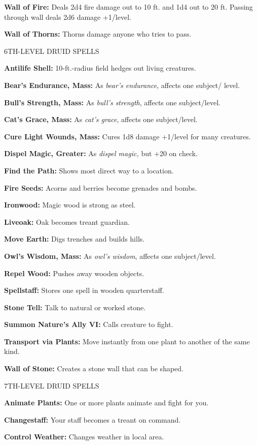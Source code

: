 \documentclass{article}
\begin{document}
\textbf{Wall of Fire:} Deals 2d4 fire damage out to 10 ft. and 1d4 out to 20 ft. 
Passing through wall deals 2d6 damage +1/level.

\textbf{Wall of Thorns:} Thorns damage anyone who tries to pass.

6TH-LEVEL DRUID SPELLS

\textbf{Antilife Shell:} 10-ft.-radius field hedges out living creatures.

\textbf{Bear's Endurance, Mass:} As \textit{bear's endurance}, affects one subject/ 
level.

\textbf{Bull's Strength, Mass:} As \textit{bull's strength}, affects one subject/level.

\textbf{Cat's Grace, Mass:} As \textit{cat's grace}, affects one subject/level.

\textbf{Cure Light Wounds, Mass:} Cures 1d8 damage +1/level for many creatures.

\textbf{Dispel Magic, Greater:} As \textit{dispel magic, }but +20 on check.

\textbf{Find the Path:} Shows most direct way to a location.

\textbf{Fire Seeds:} Acorns and berries become grenades and bombs.

\textbf{Ironwood:} Magic wood is strong as steel.

\textbf{Liveoak:} Oak becomes treant guardian.

\textbf{Move Earth:} Digs trenches and builds hills.

\textbf{Owl's Wisdom, Mass:} As \textit{owl's wisdom}, affects one subject/level.

\textbf{Repel Wood:} Pushes away wooden objects.

\textbf{Spellstaff:} Stores one spell in wooden quarterstaff.

\textbf{Stone Tell:} Talk to natural or worked stone.

\textbf{Summon Nature's Ally VI:} Calls creature to fight.

\textbf{Transport via Plants:} Move instantly from one plant to another of the 
same kind.

\textbf{Wall of Stone:} Creates a stone wall that can be shaped.

7TH-LEVEL DRUID SPELLS

\textbf{Animate Plants:} One or more plants animate and fight for you.

\textbf{Changestaff:} Your staff becomes a treant on command.

\textbf{Control Weather:} Changes weather in local area.
\end{document}
